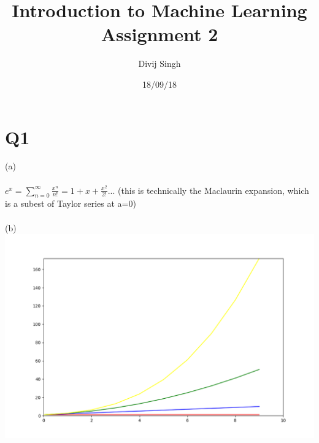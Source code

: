 \documentclass{article}
\title{Introduction to Machine Learning Assignment 2}
\author{Divij Singh}
\date{18/09/18}
\begin{document}
	\maketitle
	
	\section{Q1}
	(a) \\ \\$e^x = \sum_{n=0}^{\infty} \frac{x^n}{n!} = 1 + x +\frac{x^2}{2!} ...$ (this is technically the Maclaurin expansion, which is a subest of Taylor series at a=0)\\ \\
(b)\\
\includegraphics[scale=0.5]{taylor graph.png}

	
\end{document}
